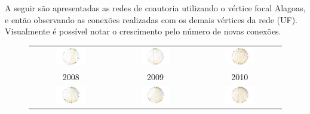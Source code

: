 \documentclass[12pt]{article}
\begin{document}
A seguir são apresentadas as redes de coautoria utilizando o vértice focal Alagoas, e então observando as conexões realizadas com os demais vértices da rede (UF). Visualmente é possível notar o crescimento pelo número de novas conexões.


\begin{figure}[H]
\begin{tabular}{ccc}
\includegraphics[width=0.38\textwidth]{images/rede-al-2008.pdf} &   \includegraphics[width=0.38\textwidth]{images/rede-al-2009.pdf} &
\includegraphics[width=0.38\textwidth]{images/rede-al-2010.pdf}\\
2008 & 2009 & 2010\\[6pt] 
\includegraphics[width=0.38\textwidth]{images/rede-al-2011.pdf} &
\includegraphics[width=0.38\textwidth]{images/rede-al-2012.pdf} &   \includegraphics[width=0.38\textwidth]{images/rede-al-2013.pdf} \\

\end{tabular}
\end{figure}
\end{document}
